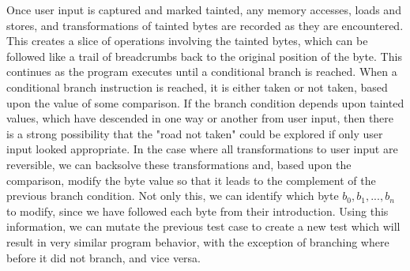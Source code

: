 \documentclass[11pt,expanded,copyright]{fsuthesis}
\begin{document}
Once user input is captured and marked tainted, any memory accesses, loads and stores, and transformations of tainted bytes are recorded as they are encountered. This creates a slice of operations involving the tainted bytes, which can be followed like a trail of breadcrumbs back to the original position of the byte. This continues as the program executes until a conditional branch is reached. When a conditional branch instruction is reached, it is either taken or not taken, based upon the value of some comparison. If the branch condition depends upon tainted values, which have descended in one way or another from user input, then there is a strong possibility that the "road not taken" could be explored if only user input looked appropriate. In the case where all transformations to user input are reversible, we can backsolve these transformations and, based upon the comparison, modify the byte value so that it leads to the complement of the previous branch condition. Not only this, we can identify which byte $b_0,b_1,...,b_n$ to modify, since we have followed each byte from their introduction. Using this information, we can mutate the previous test case to create a new test which will result in very similar program behavior, with the exception of branching where before it did not branch, and vice versa.

\end{document}
